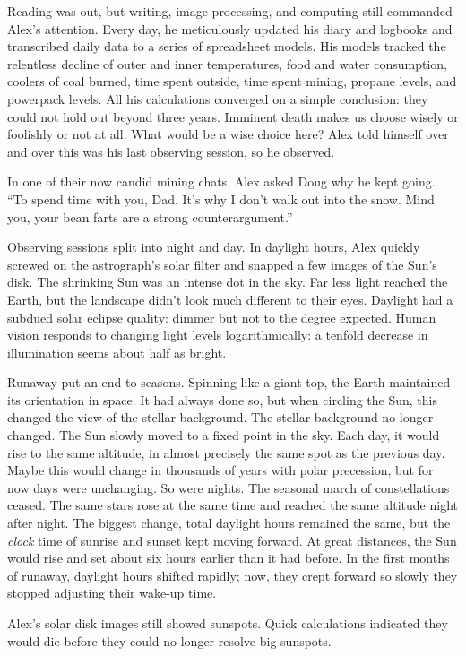 Reading was out, but writing, image processing, and computing still
commanded Alex's attention. Every day, he meticulously updated his diary
and logbooks and transcribed daily data to a series of spreadsheet
models. His models tracked the relentless decline of outer and inner
temperatures, food and water consumption, coolers of coal burned, time
spent outside, time spent mining, propane levels, and powerpack levels.
All his calculations converged on a simple conclusion: they could not
hold out beyond three years. Imminent death makes us choose wisely or
foolishly or not at all. What would be a wise choice here? Alex told
himself over and over this was his last observing session, so he
observed.

In one of their now candid mining chats, Alex asked Doug why he kept
going. ``To spend time with you, Dad. It's why I don't walk out into the
snow. Mind you, your bean farts are a strong counterargument.''

Observing sessions split into night and day. In daylight hours, Alex
quickly screwed on the astrograph's solar filter and snapped a few
images of the Sun's disk. The shrinking Sun was an intense dot in the
sky. Far less light reached the Earth, but the landscape didn't look
much different to their eyes. Daylight had a subdued solar eclipse
quality: dimmer but not to the degree expected. Human vision responds to
changing light levels logarithmically: a tenfold decrease in
illumination seems about half as bright.

Runaway put an end to seasons. Spinning like a giant top, the Earth
maintained its orientation in space. It had always done so, but when
circling the Sun, this changed the view of the stellar background. The
stellar background no longer changed. The Sun slowly moved to a fixed
point in the sky. Each day, it would rise to the same altitude, in
almost precisely the same spot as the previous day. Maybe this would
change in thousands of years with polar precession, but for now days
were unchanging. So were nights. The seasonal march of constellations
ceased. The same stars rose at the same time and reached the same
altitude night after night. The biggest change, total daylight hours
remained the same, but the \emph{clock} time of sunrise and sunset kept
moving forward. At great distances, the Sun would rise and set about six
hours earlier than it had before. In the first months of runaway,
daylight hours shifted rapidly; now, they crept forward so slowly they
stopped adjusting their wake-up time.

Alex's solar disk images still showed sunspots. Quick calculations
indicated they would die before they could no longer resolve big
sunspots.

